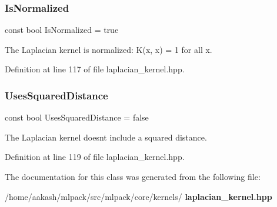 \subsubsection{Is\+Normalized}
{\footnotesize\ttfamily const bool Is\+Normalized = true\hspace{0.3cm}{\ttfamily [static]}}



The Laplacian kernel is normalized\+: K(x, x) = 1 for all x. 



Definition at line 117 of file laplacian\+\_\+kernel.\+hpp.

\mbox{\label{classmlpack_1_1kernel_1_1KernelTraits_3_01LaplacianKernel_01_4_a12fc177e124e69c8efbac5b08e5c5196}} 
\subsubsection{Uses\+Squared\+Distance}
{\footnotesize\ttfamily const bool Uses\+Squared\+Distance = false\hspace{0.3cm}{\ttfamily [static]}}



The Laplacian kernel doesn\textquotesingle{}t include a squared distance. 



Definition at line 119 of file laplacian\+\_\+kernel.\+hpp.



The documentation for this class was generated from the following file\+:\begin{DoxyCompactItemize}
\item 
/home/aakash/mlpack/src/mlpack/core/kernels/\textbf{ laplacian\+\_\+kernel.\+hpp}\end{DoxyCompactItemize}
